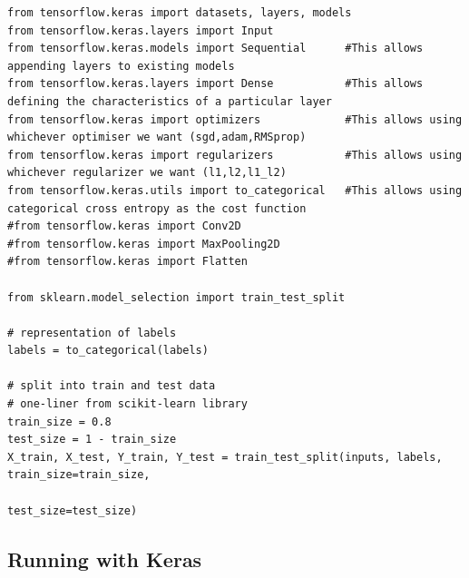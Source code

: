 \documentclass[%
oneside,                 %
final,                   %
10pt]{article}
\begin{document}
\begin{verbatim}
from tensorflow.keras import datasets, layers, models
from tensorflow.keras.layers import Input
from tensorflow.keras.models import Sequential      #This allows appending layers to existing models
from tensorflow.keras.layers import Dense           #This allows defining the characteristics of a particular layer
from tensorflow.keras import optimizers             #This allows using whichever optimiser we want (sgd,adam,RMSprop)
from tensorflow.keras import regularizers           #This allows using whichever regularizer we want (l1,l2,l1_l2)
from tensorflow.keras.utils import to_categorical   #This allows using categorical cross entropy as the cost function
#from tensorflow.keras import Conv2D
#from tensorflow.keras import MaxPooling2D
#from tensorflow.keras import Flatten

from sklearn.model_selection import train_test_split

# representation of labels
labels = to_categorical(labels)

# split into train and test data
# one-liner from scikit-learn library
train_size = 0.8
test_size = 1 - train_size
X_train, X_test, Y_train, Y_test = train_test_split(inputs, labels, train_size=train_size,
                                                    test_size=test_size)

\end{verbatim}


\subsection{Running with Keras}
\end{document}
